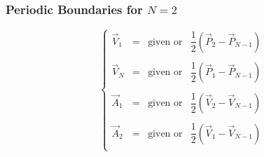 \documentclass[aps,12pt]{revtex4}
\begin{document}
\subsubsection{Periodic Boundaries for $N=2$}
\begin{equation}
\left\lbrace
\begin{array}{rcll}
\vec{V}_1 & = & \text{given or} & \dfrac{1}{2}\left(\vec{P}_2 - \vec{P}_{N-1}\right)\\ 
\\
\vec{V}_N & = & \text{given or} & \dfrac{1}{2}\left(\vec{P}_1 - \vec{P}_{N-1}\right)\\
\\
\vec{A}_1 & = & \text{given or} &  \dfrac{1}{2}\left(\vec{V}_2 - \vec{V}_{N-1}\right)\\ 
\\
\vec{A}_2 & = & \text{given or} &  \dfrac{1}{2}\left(\vec{V}_1 - \vec{V}_{N-1}\right)\\ 
\end{array} 
\right.
\end{equation}
\end{document}
